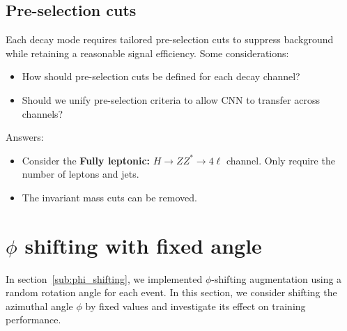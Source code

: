 \documentclass[12pt]{article}
\begin{document}
    \subsection{Pre-selection cuts}%
    \label{sub:pre_selection_cuts}
        Each decay mode requires tailored pre-selection cuts to suppress background while retaining a reasonable signal efficiency. Some considerations:

        \begin{itemize}
            \item How should pre-selection cuts be defined for each decay channel? 
            \item Should we unify pre-selection criteria to allow CNN to transfer across channels? \\
        \end{itemize}

        Answers:
        \begin{itemize}
            \item Consider the \textbf{Fully leptonic:} $H \to ZZ^* \to 4\ell$ channel. Only require the number of leptons and jets.
            \item The invariant mass cuts can be removed.
        \end{itemize}

\section{\texorpdfstring{$\phi$}{phi} shifting with fixed angle}%
\label{sec:phi_shifting_with_fixed_angle}

    In section~\ref{sub:phi_shifting}, we implemented $\phi$-shifting augmentation using a random rotation angle for each event. In this section, we consider shifting the azimuthal angle $\phi$ by fixed values and investigate its effect on training performance.
\end{document}
